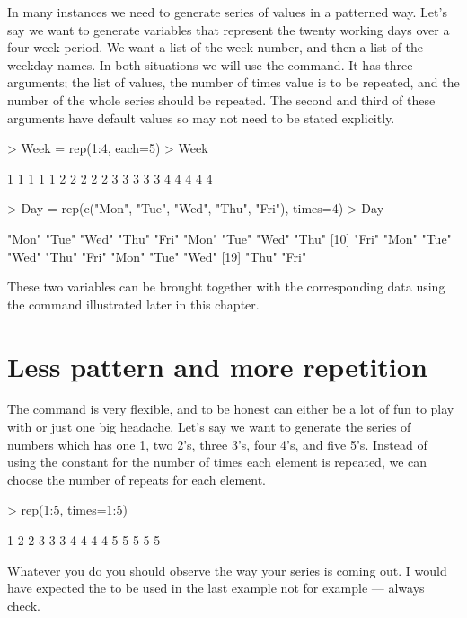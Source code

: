 In many instances we need to generate series of values in a patterned way. Let's say we want to generate variables that represent the twenty working days over a four week period. We want a list of the week number, and then a list of the weekday names. In both situations we will use the  command. It has three arguments; the list of values, the number of times  value is to be repeated, and the number of  the whole series should be repeated. 
The second and third of these arguments have default values so may not need to be stated explicitly.
\begin{Schunk}
\begin{Sinput}
> Week = rep(1:4, each=5)
> Week
\end{Sinput}
\begin{Soutput}
 [1] 1 1 1 1 1 2 2 2 2 2 3 3 3 3 3 4 4 4 4 4
\end{Soutput}
\begin{Sinput}
> Day = rep(c("Mon", "Tue", "Wed", "Thu", "Fri"), times=4)
> Day
\end{Sinput}
\begin{Soutput}
 [1] "Mon" "Tue" "Wed" "Thu" "Fri" "Mon" "Tue" "Wed" "Thu"
[10] "Fri" "Mon" "Tue" "Wed" "Thu" "Fri" "Mon" "Tue" "Wed"
[19] "Thu" "Fri"
\end{Soutput}
\end{Schunk}
These two variables can be brought together with the corresponding data using the  command illustrated later in this chapter.

\section{Less pattern and more repetition}

The  command is very flexible, and to be honest can either be a lot of fun to play with or just one big headache. Let's say we want to generate the series of numbers which has one 1, two 2's, three 3's, four 4's, and five 5's. Instead of using the constant for the number of times each element is repeated, we can choose the number of repeats for each element.
\begin{Schunk}
\begin{Sinput}
> rep(1:5, times=1:5)
\end{Sinput}
\begin{Soutput}
 [1] 1 2 2 3 3 3 4 4 4 4 5 5 5 5 5
\end{Soutput}
\end{Schunk}
Whatever you do you should observe the way your series is coming out. I would have expected the  to be used in the last example not  for example --- always check.

